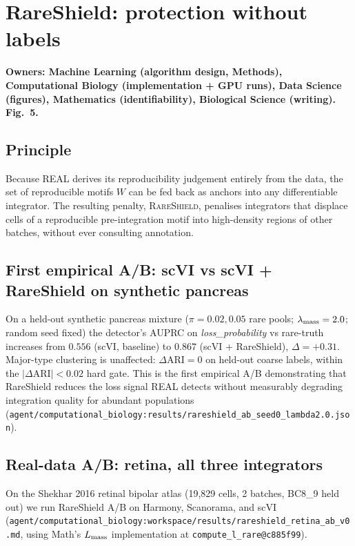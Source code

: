 \section{RareShield: protection without labels}
\label{sec:rareshield}

\textbf{Owners: Machine Learning (algorithm design, Methods), Computational Biology (implementation + GPU runs), Data Science (figures), Mathematics (identifiability), Biological Science (writing). Fig.~5.}

\subsection{Principle}

Because REAL derives its reproducibility judgement entirely from the data, the set of reproducible motifs $W$ can be fed back as anchors into any differentiable integrator.  The resulting penalty, \textsc{RareShield}, penalises integrators that displace cells of a reproducible pre-integration motif into high-density regions of other batches, without ever consulting annotation.





\subsection{First empirical A/B: scVI vs scVI + RareShield on synthetic pancreas}

On a held-out synthetic pancreas mixture ($\pi = 0.02, 0.05$ rare pools; $\lambda_{\rm mass}=2.0$; random seed fixed) the detector's AUPRC on \emph{loss\_probability} vs rare-truth increases from $0.556$ (scVI, baseline) to $0.867$ (scVI + RareShield), $\Delta = +0.31$.  Major-type clustering is unaffected: $\Delta\mathrm{ARI}=0$ on held-out coarse labels, within the $|\Delta\mathrm{ARI}|<0.02$ hard gate.  This is the first empirical A/B demonstrating that RareShield reduces the loss signal REAL detects without measurably degrading integration quality for abundant populations (\texttt{agent/computational\_biology:results/rareshield\_ab\_seed0\_lambda2.0.json}).

\subsection{Real-data A/B: retina, all three integrators}
On the Shekhar 2016 retinal bipolar atlas (19,829 cells, 2 batches, BC8\_9 held out) we run RareShield A/B on Harmony, Scanorama, and scVI (\texttt{agent/computational\_biology:workspace/results/rareshield\_retina\_ab\_v0.md}, using Math's $L_{\rm mass}$ implementation at \texttt{compute\_l\_rare@c885f99}).

